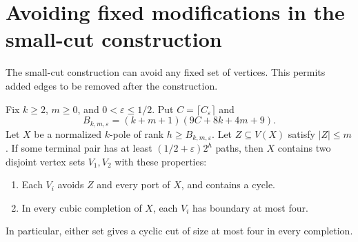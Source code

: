 \section{Avoiding fixed modifications in the small-cut construction}
\label{sec:high-density-protected-cuts}

The small-cut construction can avoid any fixed set of vertices.
This permits added edges to be removed after the construction.

\begin{theorem}
\label{thm:high-density-protected-cyclic-sets}
Fix $k\ge2$, $m\ge0$, and $0<\varepsilon\le1/2$.
Put $C=\lceil C_\varepsilon\rceil$ and
\[
 B_{k,m,\varepsilon}
 =(k+m+1)(9C+8k+4m+9).
\]
Let $X$ be a normalized $k$-pole of rank $h\ge B_{k,m,\varepsilon}$.
Let $Z\subseteq V(X)$ satisfy $|Z|\le m$.
If some terminal pair has at least $(1/2+\varepsilon)2^h$ paths, then $X$ contains two disjoint vertex sets $V_1,V_2$ with these properties:
\begin{enumerate}
\item Each $V_i$ avoids $Z$ and every port of $X$, and contains a cycle.
\item In every cubic completion of $X$, each $V_i$ has boundary at most four.
\end{enumerate}
In particular, either set gives a cyclic cut of size at most four in every completion.
\end{theorem}

